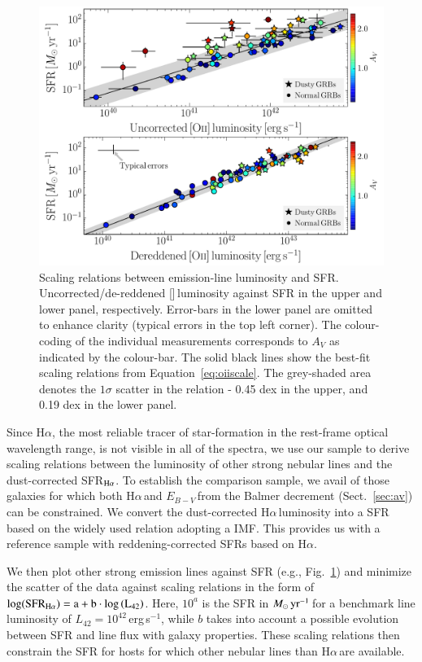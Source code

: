 \documentclass[traditabstract, longauth]{aa}
\newcommand{\ha}{H$\alpha$}
\newcommand{\ebv}{$E_{B-V}\,$}
\newcommand{\oii}{[\ion{O}{ii}]}
\newcommand{\Msunyr}{$M_\odot\,\rm{yr}^{-1}$}
\begin{document}
\begin{figure}
\includegraphics[angle=0, width=0.99\columnwidth]{Figs/Ha_OII.pdf}
\caption{Scaling relations between emission-line luminosity and SFR. Uncorrected/de-reddened \oii\,luminosity against SFR in the upper and lower panel, respectively. Error-bars in the lower panel are omitted to enhance clarity (typical errors in the top left corner). The colour-coding of the individual measurements corresponds to $A_V$ as indicated by the colour-bar. The solid black lines show the best-fit scaling relations from Equation~\ref{eq:oiiscale}. The grey-shaded area denotes the $1\sigma$ scatter in the relation - 0.45 dex in the upper, and 0.19 dex in the lower panel.}
\label{fig:haoii}
\end{figure}

Since \ha, the most reliable tracer of star-formation in the rest-frame optical wavelength range, is not visible in all of the spectra, we use our sample to derive scaling relations between the luminosity of other strong nebular lines and the dust-corrected SFR$_{\rm{H}\alpha}$. To establish the comparison sample, we avail of those galaxies for which both \ha\,and \ebv from the Balmer decrement (Sect.~\ref{sec:av}) can be constrained. We convert the dust-corrected \ha\,luminosity into a SFR based on the widely used \citet{1998ARA&A..36..189K} relation adopting a \citet{2003PASP..115..763C} IMF. This provides us with a reference sample with reddening-corrected SFRs based on \ha.

We then plot other strong emission lines against SFR (e.g., Fig.~\ref{fig:haoii}) and minimize the scatter of the data against scaling relations in the form of $\log(\rm{SFR_{H\alpha}}) = a + b\cdot\log\left(L_{42}\right)$. Here, $10^{a}$ is the SFR in \Msunyr\,for a benchmark line luminosity of $L_{42}=10^{42}$\,erg\,{s}$^{-1}$, while $b$ takes into account a possible evolution between SFR and line flux with galaxy properties. These scaling relations then constrain the SFR for hosts for which other nebular lines than \ha\,are available.
\end{document}
